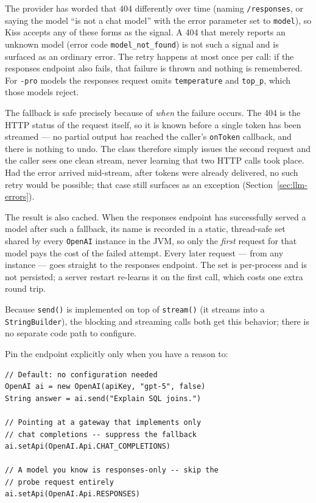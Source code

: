 \noindent
The provider has worded that 404 differently over time (naming \texttt{/responses}, or saying the model ``is not a chat model'' with the error parameter set to \texttt{model}), so Kiss accepts any of these forms as the signal.  A 404 that merely reports an unknown model (error code \texttt{model\_not\_found}) is not such a signal and is surfaced as an ordinary error.  The retry happens at most once per call: if the responses endpoint also fails, that failure is thrown and nothing is remembered.  For \texttt{-pro} models the responses request omits \texttt{temperature} and \texttt{top\_p}, which those models reject.

The fallback is safe precisely because of \emph{when} the failure occurs.  The 404 is the HTTP status of the request itself, so it is known before a single token has been streamed --- no partial output has reached the caller's \texttt{onToken} callback, and there is nothing to undo.  The class therefore simply issues the second request and the caller sees one clean stream, never learning that two HTTP calls took place.  Had the error arrived mid-stream, after tokens were already delivered, no such retry would be possible; that case still surfaces as an exception (Section~\ref{sec:llm-errors}).

The result is also cached.  When the responses endpoint has successfully served a model after such a fallback, its name is recorded in a static, thread-safe set shared by every \texttt{OpenAI} instance in the JVM, so only the \emph{first} request for that model pays the cost of the failed attempt.  Every later request --- from any instance --- goes straight to the responses endpoint.  The set is per-process and is not persisted; a server restart re-learns it on the first call, which costs one extra round trip.

Because \texttt{send()} is implemented on top of \texttt{stream()} (it streams into a \texttt{StringBuilder}), the blocking and streaming calls both get this behavior; there is no separate code path to configure.

Pin the endpoint explicitly only when you have a reason to:

\begin{lstlisting}[style=groovy]
// Default: no configuration needed
OpenAI ai = new OpenAI(apiKey, "gpt-5", false)
String answer = ai.send("Explain SQL joins.")

// Pointing at a gateway that implements only
// chat completions -- suppress the fallback
ai.setApi(OpenAI.Api.CHAT_COMPLETIONS)

// A model you know is responses-only -- skip the
// probe request entirely
ai.setApi(OpenAI.Api.RESPONSES)
\end{lstlisting}

